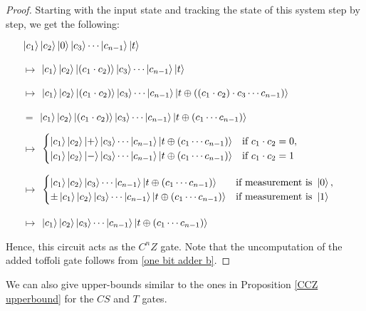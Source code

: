 \documentclass[12pt]{dalthesis}
\begin{document}
\begin{proof}
Starting with the input state and tracking the state of this system step by step, we get the following: 
\begin{itemize}
\item[] $\ket{c_1}\ket{c_2}\ket{0}\ket{c_3} \cdots \ket{c_{n-1}}\ket{t}$
\item[$\mapsto$] $\ket{c_1}\ket{c_2}\ket{(c_1 \cdot c_2)}\ket{c_3} \cdots \ket{c_{n-1}}\ket{t}$
\item[$\mapsto$] $\ket{c_1}\ket{c_2}\ket{(c_1 \cdot c_2)}\ket{c_3} \cdots \ket{c_{n-1}} \ket{t \oplus ((c_1 \cdot c_2) \cdot c_3 \cdots c_{n-1})}$
\item[$=$] $\ket{c_1}\ket{c_2}\ket{(c_1 \cdot c_2)}\ket{c_3} \cdots \ket{c_{n-1}} \ket{t \oplus (c_1 \cdots c_{n-1})}$
\item[$\mapsto$] $\begin{cases} \ket{c_1}\ket{c_2}\ket{+}\ket{c_3} \cdots \ket{c_{n-1}} \ket{t \oplus (c_1 \cdots c_{n-1})} & \mbox{if } c_1 \cdot c_2 = 0, \\
\ket{c_1}\ket{c_2}\ket{-}\ket{c_3} \cdots \ket{c_{n-1}} \ket{t \oplus (c_1 \cdots c_{n-1})} & \mbox{if } c_1 \cdot c_2 = 1 \end{cases}$
\item[$\mapsto$] $\begin{cases} \ket{c_1}\ket{c_2}\ket{c_3} \cdots \ket{c_{n-1}} \ket{t \oplus (c_1 \cdots c_{n-1})} & \mbox{if measurement is } \ket{0} , \\
\pm \ket{c_1}\ket{c_2}\ket{c_3} \cdots \ket{c_{n-1}} \ket{t \oplus (c_1 \cdots c_{n-1})} & \mbox{if measurement is } \ket{1} \end{cases}$
\item[$\mapsto$] $\ket{c_1}\ket{c_2}\ket{c_3} \cdots \ket{c_{n-1}}\ket{t \oplus (c_1 \cdots c_{n-1})}$
\end{itemize}
Hence, this circuit acts as the $C^nZ$ gate. Note that the uncomputation of the added toffoli gate follows from \ref{one bit adder b}.
\end{proof}


We can also give upper-bounds similar to the ones in Proposition \ref{CCZ upperbound} for the $CS$ and $T$ gates.
\end{document}
